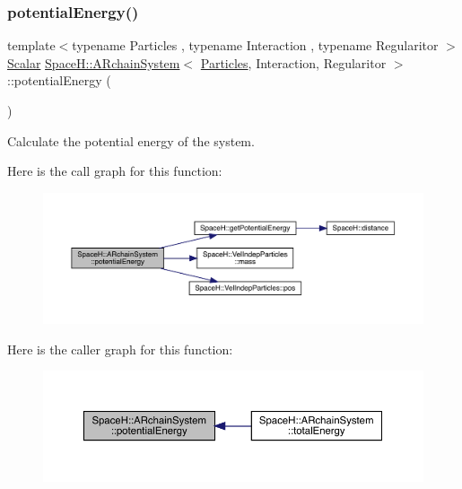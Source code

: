 \subsubsection{\texorpdfstring{potential\+Energy()}{potentialEnergy()}}
{\footnotesize\ttfamily template$<$typename Particles , typename Interaction , typename Regularitor $>$ \\
\mbox{\hyperlink{class_space_h_1_1_a_rchain_system_acaaa03940944dd5d6978c575888dd308}{Scalar}} \mbox{\hyperlink{class_space_h_1_1_a_rchain_system}{Space\+H\+::\+A\+Rchain\+System}}$<$ \mbox{\hyperlink{struct_space_h_1_1_particles}{Particles}}, Interaction, Regularitor $>$\+::potential\+Energy (\begin{DoxyParamCaption}{ }\end{DoxyParamCaption})\hspace{0.3cm}{\ttfamily [inline]}}



Calculate the potential energy of the system. 

Here is the call graph for this function\+:
\nopagebreak
\begin{figure}[H]
\begin{center}
\leavevmode
\includegraphics[width=350pt]{class_space_h_1_1_a_rchain_system_adf6a2220ead064e01251a74ecbd7eb41_cgraph}
\end{center}
\end{figure}
Here is the caller graph for this function\+:
\nopagebreak
\begin{figure}[H]
\begin{center}
\leavevmode
\includegraphics[width=350pt]{class_space_h_1_1_a_rchain_system_adf6a2220ead064e01251a74ecbd7eb41_icgraph}
\end{center}
\end{figure}
\mbox{\label{class_space_h_1_1_a_rchain_system_a069b5ae075413b26fa177df689bf044d}} 
